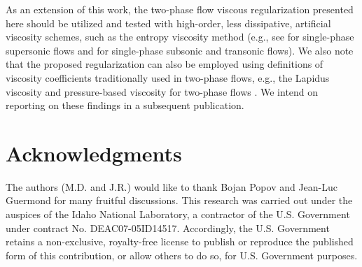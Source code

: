 \documentclass[preprint,10pt]{elsarticle}
\begin{document}
As an extension of this work, the two-phase flow viscous regularization presented here should be utilized and tested with high-order, less dissipative, artificial viscosity schemes, 
such as the entropy viscosity method (e.g., see \cite{jlg1} for single-phase supersonic flows and \cite{Marco_paper_low_mach} for single-phase subsonic and transonic flows). 
We also note that the proposed regularization can also be employed using definitions of viscosity coefficients traditionally used in two-phase flows, e.g., 
the Lapidus viscosity \cite{Lapidus_paper, Lapidus_book} and pressure-based viscosity for two-phase flows \cite{PBV_book}. We intend on reporting on these findings in a subsequent
publication. 
%
\section*{Acknowledgments} 
The authors (M.D. and J.R.) would like to thank Bojan Popov and Jean-Luc Guermond for many fruitful discussions.  
This research was carried out under the auspices of the Idaho National Laboratory, a contractor of the U.S. Government under contract No. DEAC07-05ID14517.  Accordingly, the U.S. Government retains a non-exclusive, royalty-free license to publish or reproduce the published form of this contribution, or allow others to do so, for U.S. Government purposes.

\clearpage

\end{document}
